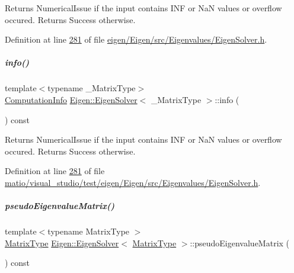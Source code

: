 \begin{DoxyReturn}{Returns}
Numerical\+Issue if the input contains I\+NF or NaN values or overflow occured. Returns Success otherwise. 
\end{DoxyReturn}


Definition at line \hyperlink{eigen_2_eigen_2src_2_eigenvalues_2_eigen_solver_8h_source_l00281}{281} of file \hyperlink{eigen_2_eigen_2src_2_eigenvalues_2_eigen_solver_8h_source}{eigen/\+Eigen/src/\+Eigenvalues/\+Eigen\+Solver.\+h}.

\mbox{\label{group___eigenvalues___module_ac4af54fadc33abcdd1778c87bfbf005b}} 
\subparagraph{\texorpdfstring{info()}{info()}\hspace{0.1cm}{\footnotesize\ttfamily [2/2]}}
{\footnotesize\ttfamily template$<$typename \+\_\+\+Matrix\+Type$>$ \\
\hyperlink{group__enums_ga85fad7b87587764e5cf6b513a9e0ee5e}{Computation\+Info} \hyperlink{group___eigenvalues___module_class_eigen_1_1_eigen_solver}{Eigen\+::\+Eigen\+Solver}$<$ \+\_\+\+Matrix\+Type $>$\+::info (\begin{DoxyParamCaption}{ }\end{DoxyParamCaption}) const\hspace{0.3cm}{\ttfamily [inline]}}

\begin{DoxyReturn}{Returns}
Numerical\+Issue if the input contains I\+NF or NaN values or overflow occured. Returns Success otherwise. 
\end{DoxyReturn}


Definition at line \hyperlink{matio_2visual__studio_2test_2eigen_2_eigen_2src_2_eigenvalues_2_eigen_solver_8h_source_l00281}{281} of file \hyperlink{matio_2visual__studio_2test_2eigen_2_eigen_2src_2_eigenvalues_2_eigen_solver_8h_source}{matio/visual\+\_\+studio/test/eigen/\+Eigen/src/\+Eigenvalues/\+Eigen\+Solver.\+h}.

\mbox{\label{group___eigenvalues___module_a4979eafe0aeef06b19ada7fa5e19db17}} 
\subparagraph{\texorpdfstring{pseudo\+Eigenvalue\+Matrix()}{pseudoEigenvalueMatrix()}\hspace{0.1cm}{\footnotesize\ttfamily [1/2]}}
{\footnotesize\ttfamily template$<$typename Matrix\+Type $>$ \\
\hyperlink{group___eigenvalues___module_a83acd180404ddaac8a678fa65a6b632b}{Matrix\+Type} \hyperlink{group___eigenvalues___module_class_eigen_1_1_eigen_solver}{Eigen\+::\+Eigen\+Solver}$<$ \hyperlink{group___eigenvalues___module_a83acd180404ddaac8a678fa65a6b632b}{Matrix\+Type} $>$\+::pseudo\+Eigenvalue\+Matrix (\begin{DoxyParamCaption}{ }\end{DoxyParamCaption}) const}



